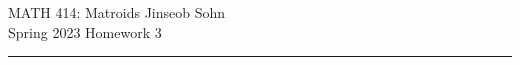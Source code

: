 \documentclass[12pt, letterpaper]{article}
\begin{document}
\noindent MATH 414: Matroids \hfill Jinseob Sohn \\
Spring 2023 \hfill Homework 3
\rule[8pt]{\textwidth}{0.6pt}
\end{document}
